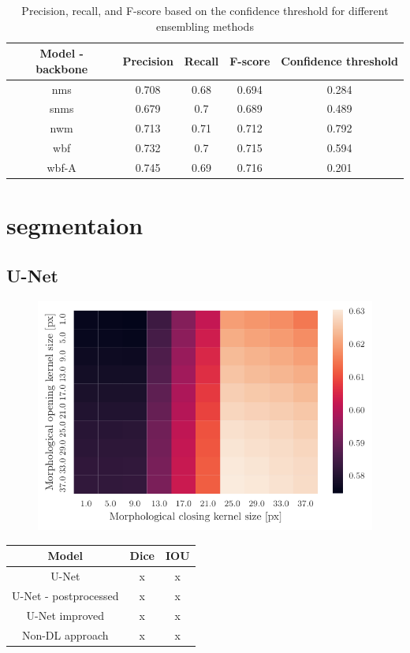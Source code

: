 \begin{table}
    \begin{tabular}{c||c|c|c|c}
        Model - backbone & Precision & Recall & F-score & Confidence threshold \\ \hline \hline
        nms              & 0.708     & 0.68   & 0.694   & 0.284                \\ \hline
        snms             & 0.679     & 0.7    & 0.689   & 0.489                \\ \hline
        nwm              & 0.713     & 0.71   & 0.712   & 0.792                \\ \hline
        wbf              & 0.732     & 0.7    & 0.715   & 0.594                \\ \hline
        wbf-A            & 0.745     & 0.69   & 0.716   & 0.201                \\ \hline
    \end{tabular}
    \caption{Precision, recall, and F-score based on the confidence threshold for different ensembling methods}
    \label{tab:ensembling_prf}
\end{table}

\section{segmentaion}
\subsection{U-Net}

\begin{figure}
    \centering
    \includegraphics[]{images/heatmap_of_unetpostproc_search.pdf}
\end{figure}

\begin{table}
    \centering
    \begin{tabular}{c|c|c}
        Model                 & Dice & IOU \\ \hline
        U-Net                 & x    & x   \\ \hline
        U-Net - postprocessed & x    & x   \\ \hline
        U-Net improved        & x    & x   \\ \hline
        Non-DL approach       & x    & x   \\
    \end{tabular}
\end{table}
